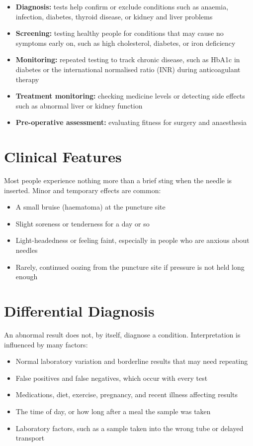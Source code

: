 \begin{itemize}
    \item \textbf{Diagnosis:} tests help confirm or exclude conditions such as anaemia, infection, diabetes, thyroid disease, or kidney and liver problems
    \item \textbf{Screening:} testing healthy people for conditions that may cause no symptoms early on, such as high cholesterol, diabetes, or iron deficiency
    \item \textbf{Monitoring:} repeated testing to track chronic disease, such as HbA1c in diabetes or the international normalised ratio (INR) during anticoagulant therapy
    \item \textbf{Treatment monitoring:} checking medicine levels or detecting side effects such as abnormal liver or kidney function
    \item \textbf{Pre-operative assessment:} evaluating fitness for surgery and anaesthesia
\end{itemize}

\section*{Clinical Features}
Most people experience nothing more than a brief sting when the needle is inserted. Minor and temporary effects are common:

\begin{itemize}
    \item A small bruise (haematoma) at the puncture site
    \item Slight soreness or tenderness for a day or so
    \item Light-headedness or feeling faint, especially in people who are anxious about needles
    \item Rarely, continued oozing from the puncture site if pressure is not held long enough
\end{itemize}

\section*{Differential Diagnosis}
An abnormal result does not, by itself, diagnose a condition. Interpretation is influenced by many factors:

\begin{itemize}
    \item Normal laboratory variation and borderline results that may need repeating
    \item False positives and false negatives, which occur with every test
    \item Medications, diet, exercise, pregnancy, and recent illness affecting results
    \item The time of day, or how long after a meal the sample was taken
    \item Laboratory factors, such as a sample taken into the wrong tube or delayed transport
\end{itemize}

